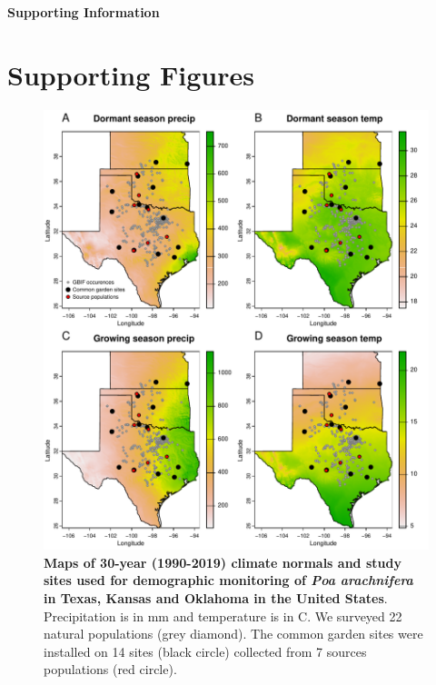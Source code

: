 \documentclass[12pt]{article}\usepackage[]{graphicx}\usepackage[dvipsnames]{xcolor}
\begin{document}
\newpage



\newpage
\clearpage 
\setcounter{equation}{0}
\setcounter{figure}{0}
\setcounter{section}{0}
\setcounter{table}{0}
\renewcommand{\theequation}{S.\arabic{equation}}
\renewcommand{\thetable}{S-\arabic{table}}
\renewcommand{\thefigure}{S-\arabic{figure}}
\renewcommand{\thesection}{S.\arabic{section}}

\centerline{\Large{\textbf{Supporting Information}}}



\section {Supporting Figures}

\begin{figure}[H]
  \begin{center}
    \includegraphics[width=0.8\linewidth]{Figures/POAR_survey_garden_map.pdf}
  \caption{\textbf{Maps of 30-year (1990-2019) climate normals and study sites used for demographic monitoring of \emph{Poa arachnifera} in Texas, Kansas and Oklahoma in the United States}.
  Precipitation is in mm and temperature is in \degree C.
  We surveyed 22 natural populations (grey diamond).
  The common garden sites were installed on 14 sites (black circle) collected from 7 sources populations (red circle).
  }
  \label{Sup:long_lat_garden}
  \end{center}
\end{figure}
\end{document}
